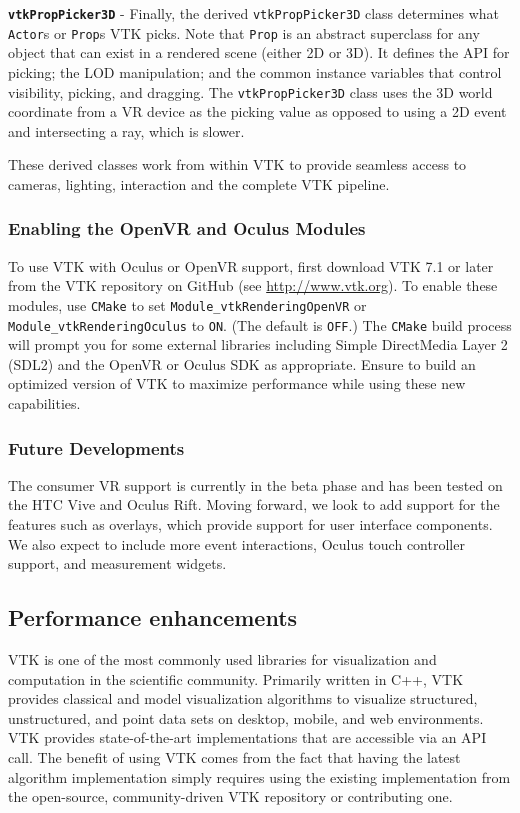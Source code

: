 \textbf{\texttt{vtkPropPicker3D}} - Finally, the derived \texttt{vtkPropPicker3D} class determines what \texttt{Actor}s or \texttt{Prop}s VTK picks.
Note that \texttt{Prop} is an abstract superclass for any object that can exist in a rendered scene (either 2D or 3D). It defines the API for picking; the LOD manipulation; and the common instance variables that control visibility, picking, and dragging.
The \texttt{vtkPropPicker3D} class uses the 3D world coordinate from a VR device as the picking value as opposed to using a 2D event and intersecting a ray, which is slower.

These derived classes work from within VTK to provide seamless access to cameras, lighting, interaction and the complete VTK pipeline.

\subsubsection{Enabling the OpenVR and Oculus Modules}

To use VTK with Oculus or OpenVR support, first download VTK 7.1 or later from the VTK
repository on GitHub (see \url{http://www.vtk.org}).
To enable these modules, use \texttt{CMake} to set \texttt{Module\_vtkRenderingOpenVR} or \texttt{Module\_vtkRenderingOculus} to \texttt{ON}. (The default is \texttt{OFF}.)
The \texttt{CMake} build process will prompt you for some external libraries including Simple DirectMedia Layer 2 (SDL2) and the OpenVR or Oculus SDK as appropriate.
Ensure to build an optimized version of VTK to maximize performance while using these new capabilities.

\subsubsection{Future Developments}

The consumer VR support is currently in the beta phase and has been tested on the HTC Vive and Oculus Rift. Moving forward, we look to add support for the features such as overlays, which provide support for user interface components. We also expect to include more event interactions, Oculus touch controller support, and measurement widgets.

\subsection{Performance enhancements}

VTK is one of the most commonly used libraries for visualization and computation in the scientific community.
Primarily written in C++, VTK provides classical and model visualization algorithms to visualize structured, unstructured, and point data sets on desktop, mobile, and web environments.
VTK provides state-of-the-art implementations that are accessible via an API call.
The benefit of using VTK comes from the fact that having the latest algorithm implementation simply requires using the existing implementation from the
open-source, community-driven VTK repository or contributing one.

